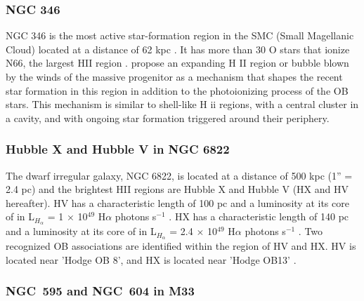 \documentclass[fleqn,usenatbib, useAMS, a4paper]{mnras}
\begin{document}
\subsubsection{NGC 346}
\label{sec:ngc-346}


NGC 346 is the most active star-formation region in the SMC (Small Magellanic Cloud) located at a distance of 62 kpc \citep{2001ApJ...562..303D}. 
It has more than 30 O stars that ionize N66, the largest HII region \citep{2011ApJ...740...10D}.
\citet{2008ApJ...688.1050G} propose an expanding H II region or bubble blown by the winds of the massive progenitor as a mechanism that shapes the recent star formation in this region in addition to the photoionizing process of the OB stars. 
This mechanism is similar to shell-like H ii regions, with a central cluster in a cavity, and with ongoing star formation triggered around their periphery.

\subsubsection{Hubble X and Hubble V in NGC 6822}
\label{sec:hubble-x-hubble}


The dwarf irregular galaxy, NGC 6822, is located at a distance of 500 kpc (1'' = 2.4 pc) \citep{2012A&A...540A.135S} and the brightest HII regions are Hubble X and Hubble V (HX and HV hereafter).
HV has a characteristic length of 100 pc and a luminosity at its core of in L$_{H_\alpha}$ = 1 $\times$ 10$^{49}$ H$\alpha$ photons s$^{-1}$ \citep{1999PASP..111.1382O}.
HX has a characteristic length of 140 pc and a luminosity at its core of in L$_{H_\alpha}$ = 2.4 $\times$ 10$^{49}$ H$\alpha$ photons s$^{-1}$ \citep{1999PASP..111.1382O}.
Two recognized OB associations \citep{1991ApJ...379..621H,1992AJ....104.1374W} are identified within the region of HV and HX. HV is located near 'Hodge OB 8', and HX is located near 'Hodge OB13'  \citep{1999PASP..111.1382O}.


\subsubsection{NGC~595 and NGC~604 in M33}
\label{sec:ngc-595-ngc}
\end{document}
